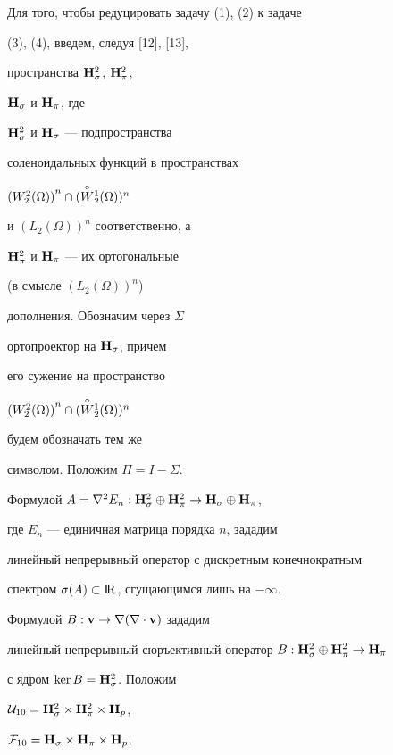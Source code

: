 Для того, чтобы редуцировать задачу (1), (2) к задаче


(3), (4), введем, следуя [12], [13],


пространства ${\bold H}_{\sigma}^2$, ${\bold H}_{\pi}^2$,


${\bold H}_{\sigma}$ и ${\bold H}_{\pi}$, где


${\bold H}_{\sigma}^2$ и ${\bold H}_{\sigma}$ --- подпространства


соленоидальных функций в пространствах


${(W_2^2(\Omega))}^n \cap (\overset{\circ}{W}{}_2^1 (\Omega)) ^n$


и ${(L_2(\Omega))}^n$ соответственно, а


${\bold H}_{\pi}^2$ и ${\bold H}_{\pi}$ --- их ортогональные


(в смысле ${(L_2(\Omega))}^n$)


дополнения. Обозначим через $\Sigma$


ортопроектор на ${\bold H}_{\sigma}$, причем


его сужение на пространство


${(W_2^2(\Omega))}^n \cap (\overset{\circ}{W}{}_2^1 (\Omega)) ^n$


будем обозначать тем же


символом. Положим $\Pi=I- \Sigma$.


Формулой $A={\nabla}^2E_n:{\bold H}_{\sigma}^2 \oplus {\bold H}_{\pi}^2 \to


{\bold H}_{\sigma} \oplus {\bold H}_{\pi}$,


где $E_n$ --- единичная матрица порядка $n$, зададим


линейный непрерывный оператор с дискретным конечнократным


спектром $\sigma (A) \subset {{\mathrm I}\!{\mathrm R}}$, сгущающимся лишь на $- \infty$.


Формулой $B: {\bold v} \to \nabla(\nabla \cdot {\bold v})$ зададим


линейный непрерывный сюръективный оператор $B:


{\bold H}_{\sigma}^2 \oplus {\bold H}_{\pi}^2 \to {\bold H}_{\pi}$


с ядром $\ker B={\bold H}_{\sigma}^2$. Положим


${\cal U}_{10}=


{\bold H}_{\sigma}^2 \times {\bold H}_{\pi}^2 \times {\bold H}_p$,


${\cal F}_{10}=


{\bold H}_{\sigma} \times {\bold H}_{\pi}\times {\bold H}_p$, 


